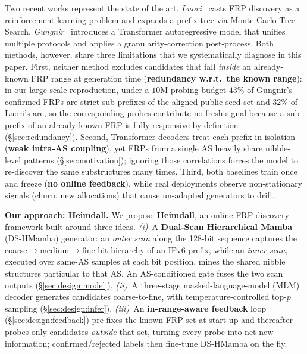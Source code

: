 \documentclass[conference]{IEEEtran}
\begin{document}
Two recent works represent the state of the art.
\emph{Luori}~\cite{cheng2024luori} casts FRP discovery as a
reinforcement-learning problem and expands a prefix tree via
Monte-Carlo Tree Search.  \emph{Gungnir}~\cite{wei2025gungnir}
introduces a Transformer autoregressive model that unifies multiple
protocols and applies a granularity-correction post-process.  Both
methods, however, share three limitations that we systematically
diagnose in this paper.
First, neither method excludes candidates that fall \emph{inside} an
already-known FRP range at generation time (\textbf{redundancy
w.r.t.\ the known range}): in our large-scale reproduction, under a
$10$M probing budget $43\%$ of Gungnir's confirmed FRPs are strict
sub-prefixes of the aligned public seed set and $32\%$ of Luori's
are, so the corresponding probes contribute no fresh signal because
a sub-prefix of an already-known FRP is fully responsive by
definition (\S\ref{sec:redundancy}).
Second, Transformer decoders treat each prefix in isolation
(\textbf{weak intra-AS coupling}), yet FRPs from a single AS
heavily share nibble-level patterns (\S\ref{sec:motivation});
ignoring those correlations forces the model to re-discover the same
substructures many times.
Third, both baselines train once and freeze (\textbf{no online
feedback}), while real deployments observe non-stationary signals
(churn, new allocations) that cause un-adapted generators to drift.

\smallskip\textbf{Our approach: Heimdall.}
We propose \textbf{Heimdall}, an online FRP-discovery framework built
around three ideas.
\emph{(i)}~A \textbf{Dual-Scan Hierarchical Mamba} (DS-HMamba)
generator: an \emph{outer scan} along the 128-bit sequence captures
the coarse$\rightarrow$medium$\rightarrow$fine bit hierarchy of an
IPv6 prefix, while an \emph{inner scan}, executed over same-AS
samples at each bit position, mines the shared nibble structures
particular to that AS.  An AS-conditioned gate fuses the two scan
outputs (\S\ref{sec:design:model}).
\emph{(ii)}~A three-stage masked-language-model (MLM) decoder
generates candidates coarse-to-fine, with temperature-controlled
top-$p$ sampling (\S\ref{sec:design:infer}).
\emph{(iii)}~An \textbf{in-range-aware feedback} loop
(\S\ref{sec:design:feedback}) pre-fixes the known-FRP set at
start-up and thereafter probes only candidates \emph{outside}
that set, turning every probe into net-new information;
confirmed/rejected labels then fine-tune DS-HMamba on the fly.
\end{document}
